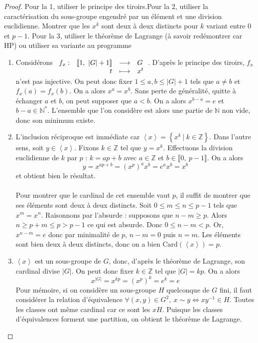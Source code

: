 \documentclass[french]{book}
\newcommand{\N}{\mathbb{N}}
\newcommand{\Z}{\mathbb{Z}}
\newcommand{\st}{^*}
\newcommand{\inv}{^{-1}}
\newcommand{\card}{\text{Card}}
\theoremstyle{definition}
\theoremstyle{theorem}
\theoremstyle{remark}
\begin{document}
\begin{proof}
	Pour la 1, utiliser le principe des tiroirs.Pour la 2, utiliser la caractérisation du sous-groupe engendré par un élément et une division euclidienne. Montrer que les $x^k$ sont deux à deux distincts pour $k$ variant entre 0 et $p-1$. Pour la 3, utiliser le théorème de Lagrange (à savoir redémontrer car HP) ou utiliser sa variante au programme
	\begin{enumerate}
		\item Considérons 
		$\begin{array}[t]{lrcl}
			f_x : & \llbracket1, \ |G|+1\rrbracket & \longrightarrow& G \\
			& t & \longmapsto &x^t
		\end{array} $. D'après le principe des tiroirs, $f_x$ n'est pas injective. On peut donc fixer $1 \leqslant a,b \leqslant |G|+1$ tels que $a\ne b$ et $f_x(a)=f_x(b)$. On a alors $x^a=x^b$. Sans perte de généralité, quitte à échanger $a$ et $b$, on peut supposer que $a<b$. On a alors $x^{b-a}=e$ et $b-a \in \N\st$. L'ensemble que l'on considère est alors une partie de $\N$ non vide, donc son minimum existe.
		\item L'inclusion réciproque est immédiate car $\left\langle x\right\rangle=\left\{x^k \ | \ k \in\Z\right\}$. Dans l'autre sens, soit $y\in \left\langle x\right\rangle$. Fixons $k\in\Z$ tel que $y=x^k$. Effectuons la division euclidienne de $k$ par $p$ : $k=ap +b$ avec $a\in\Z$ et $b\in\llbracket0, \ p-1\rrbracket$. On a alors $$y=x^{ap+b}=(x^p)^ax^b=e^ax^b=x^b$$ et obtient bien le résultat.
		\\ \\ Pour montrer que le cardinal de cet ensemble vaut $p$, il suffit de montrer que ses éléments sont deux à deux distincts.  Soit $0 \leqslant m \leqslant n \leqslant p-1$ tels que $x^m=x^n$. Raisonnons par l'absurde : supposons que $n-m \geqslant p$. Alors $n\geqslant p+m \leqslant p > p-1$ ce qui est absurde. Donc $0 \leqslant n-m <p$. Or, $x^{n-m}=e$ donc par minimalité de $p$, $n-m=0$ puis $n=m$. Les éléments sont bien deux à deux distincts, donc on a bien $\card(\left\langle x\right\rangle)=p$.
		\item $\left\langle x\right\rangle$ est un sous-groupe de $G$, donc, d'après le théorème de Lagrange, son cardinal divise $|G|$. On peut donc fixer $k\in\Z$ tel que $|G|=kp$. On a alors $$x^{|G|}=x^{kp}=(x^p)^k=e^k=e$$ Pour mémoire, si on considère un sous-groupe $H$ quelconque de $G$ fini, il faut considérer la relation d'équivalence $\forall(x,y)\in G^2, \ x\sim y \Longleftrightarrow xy\inv \in H$. Toutes les classes ont même cardinal car ce sont les $xH$. Puisque les classes d'équivalences forment une partition, on obtient le théorème de Lagrange.
	\end{enumerate}
\end{proof}
\end{document}
